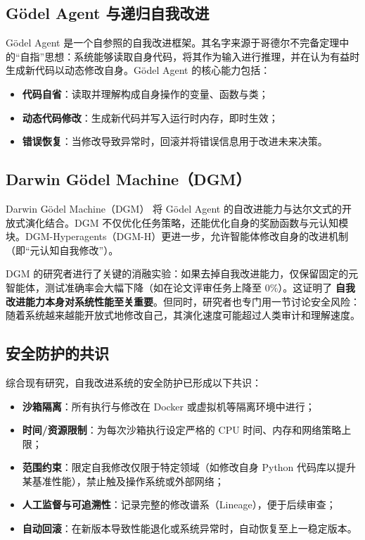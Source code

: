 \subsection{Gödel Agent 与递归自我改进}

Gödel Agent \cite{godelagent2024} 是一个自参照的自我改进框架。其名字来源于哥德尔不完备定理中的“自指”思想：系统能够读取自身代码，将其作为输入进行推理，并在认为有益时生成新代码以动态修改自身。Gödel Agent 的核心能力包括：
\begin{itemize}
    \item \textbf{代码自省}：读取并理解构成自身操作的变量、函数与类；
    \item \textbf{动态代码修改}：生成新代码并写入运行时内存，即时生效；
    \item \textbf{错误恢复}：当修改导致异常时，回滚并将错误信息用于改进未来决策。
\end{itemize}

\subsection{Darwin Gödel Machine（DGM）}

Darwin Gödel Machine（DGM）\cite{dgm2025} 将 Gödel Agent 的自改进能力与达尔文式的开放式演化结合。DGM 不仅优化任务策略，还能优化自身的奖励函数与元认知模块。DGM-Hyperagents（DGM-H）更进一步，允许智能体修改自身的改进机制（即“元认知自我修改”）。

DGM 的研究者进行了关键的消融实验：如果去掉自我改进能力，仅保留固定的元智能体，测试准确率会大幅下降（如在论文评审任务上降至 0\%）。这证明了 \textbf{自我改进能力本身对系统性能至关重要}。但同时，研究者也专门用一节讨论安全风险：随着系统越来越能开放式地修改自己，其演化速度可能超过人类审计和理解速度。

\subsection{安全防护的共识}

综合现有研究，自我改进系统的安全防护已形成以下共识：
\begin{itemize}
    \item \textbf{沙箱隔离}：所有执行与修改在 Docker 或虚拟机等隔离环境中进行；
    \item \textbf{时间/资源限制}：为每次沙箱执行设定严格的 CPU 时间、内存和网络策略上限；
    \item \textbf{范围约束}：限定自我修改仅限于特定领域（如修改自身 Python 代码库以提升某基准性能），禁止触及操作系统或外部网络；
    \item \textbf{人工监督与可追溯性}：记录完整的修改谱系（Lineage），便于后续审查；
    \item \textbf{自动回滚}：在新版本导致性能退化或系统异常时，自动恢复至上一稳定版本。
\end{itemize}

